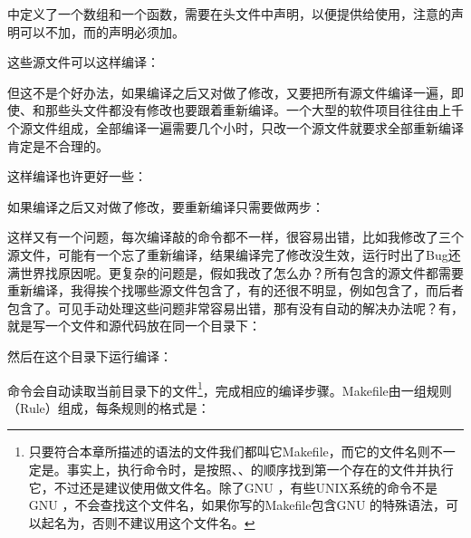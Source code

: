 


中定义了一个数组和一个函数，需要在头文件中声明，以便提供给使用，注意的声明可以不加，而的声明必须加。



这些源文件可以这样编译：




但这不是个好办法，如果编译之后又对做了修改，又要把所有源文件编译一遍，即使、和那些头文件都没有修改也要跟着重新编译。一个大型的软件项目往往由上千个源文件组成，全部编译一遍需要几个小时，只改一个源文件就要求全部重新编译肯定是不合理的。



这样编译也许更好一些：




如果编译之后又对做了修改，要重新编译只需要做两步：




这样又有一个问题，每次编译敲的命令都不一样，很容易出错，比如我修改了三个源文件，可能有一个忘了重新编译，结果编译完了修改没生效，运行时出了Bug还满世界找原因呢。更复杂的问题是，假如我改了怎么办？所有包含的源文件都需要重新编译，我得挨个找哪些源文件包含了，有的还很不明显，例如包含了，而后者包含了。可见手动处理这些问题非常容易出错，那有没有自动的解决办法呢？有，就是写一个文件和源代码放在同一个目录下：




然后在这个目录下运行编译：




命令会自动读取当前目录下的文件\footnote[33]{只要符合本章所描述的语法的文件我们都叫它Makefile，而它的文件名则不一定是。事实上，执行命令时，是按照、、的顺序找到第一个存在的文件并执行它，不过还是建议使用做文件名。除了GNU ，有些UNIX系统的命令不是GNU ，不会查找这个文件名，如果你写的Makefile包含GNU 的特殊语法，可以起名为，否则不建议用这个文件名。}，完成相应的编译步骤。Makefile由一组规则（Rule）组成，每条规则的格式是：


